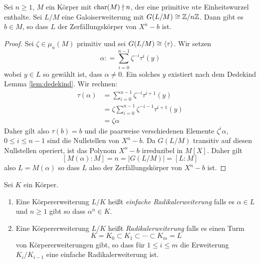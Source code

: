 \documentclass{book}
\begin{document}
\begin{thm}
    \label{thm:radikalzyklisch}
    Sei $n \ge 1$, $M$ ein Körper mit $\operatorname{char}(M) \nmid n$, der eine primitive
    $n$te Einheitswurzel enthalte. Sei $L/M$ eine Galoiserweiterung mit
    $G(L/M) \cong \mathbb{Z}/n\mathbb{Z}$. Dann gibt es $b \in M$, so dass $L$ der
    Zerfällungskörper von $X^n - b$ ist. 
\end{thm}
\begin{proof}
    Sei $\zeta \in \mu_n(M)$ primitiv und sei $G(L/M) \cong \langle \tau \rangle$. Wir
    setzen 
    \[
        \alpha : = \sum_{i = 0}^{n-1} \zeta^{-i} \tau^i(y)
    \]
    wobei $y \in L$ so gewählt ist, dass $\alpha \ne 0$. Ein solches $y$
    existiert nach dem Dedekind Lemma \ref{lem:dedekind}. Wir rechnen:
    \begin{align*}
        \tau(\alpha) & = \sum_{i = 0}^{n-1} \zeta^{-i} \tau^{i+1}(y)\\ 
                     & = \zeta \sum_{i = 0}^{n-1} \zeta^{-i-1} \tau^{i+1}(y)\\
                     & = \zeta \alpha
    \end{align*}
    Daher gilt also $\tau(b) = b$ und die paarweise verschiedenen Elemente
    $\zeta^i\alpha$, $0 \le i \le n-1$ sind die Nullstellen von $X^n - b$. Da
    $G(L/M)$ transitiv auf diesen Nullstellen operiert, ist das Polynom $X^n -
    b$ irreduzibel in $M[X]$. Daher gilt
    \[
        [M(\alpha):M] = n = |G(L/M)| = [L:M]
    \]
    also $L = M(\alpha)$ so dass $L$ also der Zerfällungskörper von $X^n - b$ ist. 
\end{proof}

\begin{defi}
    \label{defi:radikal}
    Sei $K$ ein Körper. 
    \begin{enumerate}
        \item Eine Körpererweiterung $L/K$ heißt {\em einfache
            Radikalerweiterung} falls es $\alpha \in L$ und $n \ge 1$ gibt so
            dass $\alpha^n \in K$. 
        \item Eine Körpererweiterung $L/K$ heißt {\em Radikalerweiterung} falls es einen Turm
            \[
                K = K_0 \subset K_1 \subset \cdots \subset K_m = L
            \]
            von Körpererweiterungen gibt, so dass für $1 \le i \le m$ die
            Erweiterung $K_i/K_{i-1}$ eine einfache Radikalerweiterung ist. 
    \end{enumerate}
\end{defi}
\end{document}

